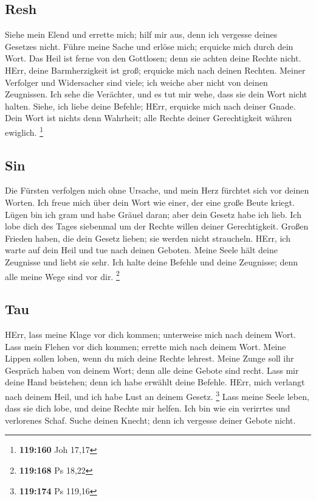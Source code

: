 \hypertarget{resh}{%
\subsection{Resh}\label{resh}}

 Siehe mein Elend und errette mich; hilf mir aus, denn
ich vergesse deines Gesetzes nicht.  Führe meine Sache
und erlöse mich; erquicke mich durch dein Wort.  Das
Heil ist ferne von den Gottlosen; denn sie achten deine Rechte nicht.
 HErr, deine Barmherzigkeit ist groß; erquicke mich nach
deinen Rechten.  Meiner Verfolger und Widersacher sind
viele; ich weiche aber nicht von deinen Zeugnissen.  Ich
sehe die Verächter, und es tut mir wehe, dass sie dein Wort nicht
halten.  Siehe, ich liebe deine Befehle; HErr, erquicke
mich nach deiner Gnade.  Dein Wort ist nichts denn
Wahrheit; alle Rechte deiner Gerechtigkeit währen ewiglich. \footnote{\textbf{119:160}
  Joh 17,17}

\hypertarget{sin}{%
\subsection{Sin}\label{sin}}

 Die Fürsten verfolgen mich ohne Ursache, und mein Herz
fürchtet sich vor deinen Worten.  Ich freue mich über
dein Wort wie einer, der eine große Beute kriegt.  Lügen
bin ich gram und habe Gräuel daran; aber dein Gesetz habe ich lieb.
 Ich lobe dich des Tages siebenmal um der Rechte willen
deiner Gerechtigkeit.  Großen Frieden haben, die dein
Gesetz lieben; sie werden nicht straucheln.  HErr, ich
warte auf dein Heil und tue nach deinen Geboten.  Meine
Seele hält deine Zeugnisse und liebt sie sehr.  Ich
halte deine Befehle und deine Zeugnisse; denn alle meine Wege sind vor
dir. \footnote{\textbf{119:168} Ps 18,22}

\hypertarget{tau}{%
\subsection{Tau}\label{tau}}

 HErr, lass meine Klage vor dich kommen; unterweise mich
nach deinem Wort.  Lass mein Flehen vor dich kommen;
errette mich nach deinem Wort.  Meine Lippen sollen
loben, wenn du mich deine Rechte lehrest.  Meine Zunge
soll ihr Gespräch haben von deinem Wort; denn alle deine Gebote sind
recht.  Lass mir deine Hand beistehen; denn ich habe
erwählt deine Befehle.  HErr, mich verlangt nach deinem
Heil, und ich habe Lust an deinem Gesetz. \footnote{\textbf{119:174} Ps
  119,16}  Lass meine Seele leben, dass sie dich lobe,
und deine Rechte mir helfen.  Ich bin wie ein verirrtes
und verlorenes Schaf. Suche deinen Knecht; denn ich vergesse deiner
Gebote nicht.

